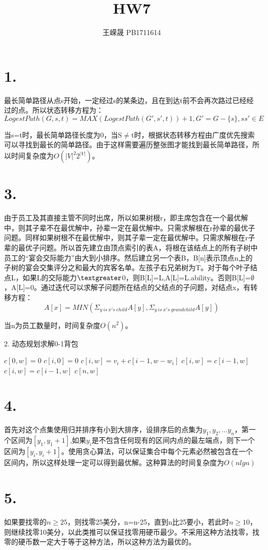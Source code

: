 \documentclass{article}
\title{HW7}
\author{王嵘晟 \quad PB1711614}
\date{}
\begin{document}
	\maketitle
	\section*{1.}
	\par{最长简单路径从点s开始，一定经过s的某条边，且在到达t前不会再次路过已经经过的点。所以状态转移方程为：}
	$$LogestPath(G,s,t)=MAX(LogestPath(G',s',t))+1,G'=G-\{s\},ss'\in E$$
	\par{当s=t时，最长简单路径长度为0，当S$\not=$t时，根据状态转移方程由广度优先搜索可以寻找到最长的简单路径。由于这样需要遍历整张图才能找到最长简单路径，所以时间复杂度为$O(|V|^{2}2^{|V|})$。}
	\section*{3.}
	\par{由于员工及其直接主管不同时出席，所以如果树根r，即主席包含在一个最优解中，则其子辈不在最优解中，孙辈一定在最优解中。只需求解根在r孙辈的最优子问题。同样如果树根不在最优解中，则其子辈一定在最优解中。只需求解根在r子辈的最优子问题。所以首先建立由顶点索引的表A，将根在该结点上的所有子树中员工的“宴会交际能力”由大到小排序。然后建立另一个表B，B[n]表示顶点n上的子树的宴会交集评分之和最大的宾客名单。左孩子右兄弟树为T。对于每个叶子结点L，如果L的交际能力$\textgreater$0，则B[L]={L},A[L]=L.ability。否则B[L]={$\emptyset$}，A[L]=0。通过迭代可以求解子问题所在结点的父结点的子问题，对结点x，有转移方程：}
	$$A[x]=MIN(\Sigma_{y\ is\ x's\ child}A[y],\Sigma_{y\ is\ x's\ grandchild}A[y]) $$
	\par{当n为员工数量时，时间复杂度$O(n^{2})$。}
	\begin{algorithm} 
	 \caption*{2. 动态规划求解0-1背包}
	 \begin{algorithmic}[1] 
	 		\State $c[0,w]=0$
	 	\EndFor
	 		\State $c[i,0]=0$
	 					\State $c[i,w]=v_{i}+c[i-1,w-w_{i}]$
	 				\Else
	 					\State $c[i,w]=c[i-1,w]$
	 				\EndIf
	 			\Else
	 				\State $c[i,w]=c[i-1,w]$
	 			\EndIf
	 		\EndFor
	 	\EndFor
	 	\State\Return $c[n,w]$
	 	\EndFunction
	 \end{algorithmic}  
	\end{algorithm}
	\section*{4.}
	\par{首先对这个点集使用归并排序有小到大排序，设排序后的点集为${y_{1},y_{2},...y_{n}}$，第一个区间为$[y_{1},y_{1}+1]$,如果$y_{i}$是不包含任何现有的区间内点的最左端点，则下一个区间为$[y_{i},y_{i}+1]$。使用贪心算法，可以保证集合中每个元素必然被包含在一个区间内，所以这样处理一定可以得到最优解。这种算法的时间复杂度为$O(nlgn)$}
	\section*{5.}
	\par{如果要找零的$n\ge 25$，则找零25美分，n=n-25，直到n比25要小，若此时$n\ge 10$，则继续找零10美分，以此类推可以保证找零用硬币最少。不采用这种方法找零，找零的硬币数一定大于等于这种方法，所以这种方法为最优的。}
\end{document}
